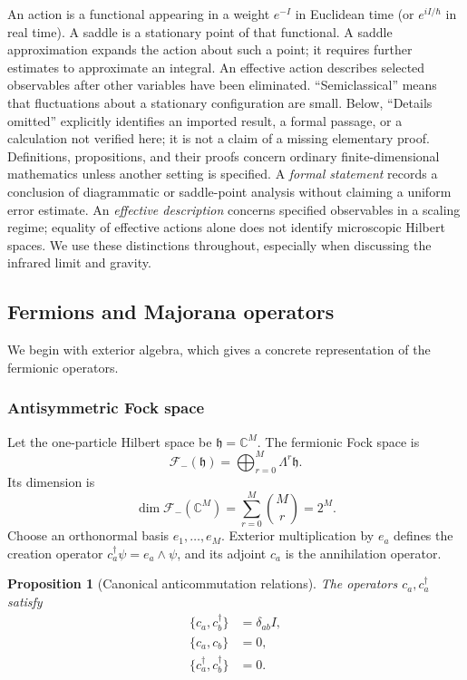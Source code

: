 \documentclass[11pt]{article}
\numberwithin{equation}{section}
\theoremstyle{exposition}
\theoremstyle{result}
\newtheorem{proposition}[definition]{Proposition}
\newcommand{\C}{\mathbb C}
\newcommand{\cF}{\mathcal F}
\begin{document}
An action is a functional appearing in a weight $e^{-I}$ in Euclidean time (or $e^{iI/\hbar}$ in real time). A saddle is a stationary point of that functional. A saddle approximation expands the action about such a point; it requires further estimates to approximate an integral. An effective action describes selected observables after other variables have been eliminated. ``Semiclassical'' means that fluctuations about a stationary configuration are small. Below, ``Details omitted'' explicitly identifies an imported result, a formal passage, or a calculation not verified here; it is not a claim of a missing elementary proof.
Definitions, propositions, and their proofs concern ordinary finite-dimensional mathematics unless another setting is specified. A \emph{formal statement} records a conclusion of diagrammatic or saddle-point analysis without claiming a uniform error estimate. An \emph{effective description} concerns specified observables in a scaling regime; equality of effective actions alone does not identify microscopic Hilbert spaces. We use these distinctions throughout, especially when discussing the infrared limit and gravity.

\subsection{Fermions and Majorana operators}

We begin with exterior algebra, which gives a concrete representation of the fermionic operators.

\subsubsection{Antisymmetric Fock space}

Let the one-particle Hilbert space be $\mathfrak h=\C^M$. The fermionic Fock space is
\begin{equation}
\cF_-(\mathfrak h)
=\bigoplus_{r=0}^{M}\Lambda^r\mathfrak h.
\label{eq:fock}
\end{equation}
Its dimension is
\begin{equation*}
\dim\cF_-(\C^M)=\sum_{r=0}^{M}\binom Mr=2^M.
\end{equation*}
Choose an orthonormal basis $e_1,\ldots,e_M$. Exterior multiplication by $e_a$ defines the creation operator $c_a^\dagger\psi=e_a\wedge\psi$, and its adjoint $c_a$ is the annihilation operator.

\begin{proposition}[Canonical anticommutation relations]
The operators $c_a,c_a^\dagger$ satisfy
\begin{align*}
\{c_a,c_b^\dagger\}&=\delta_{ab}I,\\
\{c_a,c_b\}&=0,\\
\{c_a^\dagger,c_b^\dagger\}&=0.
\end{align*}
\end{proposition}
\end{document}
